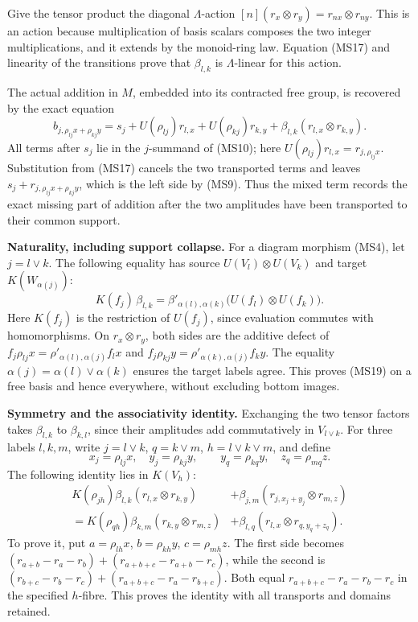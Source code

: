 \documentclass[
]{article}
\begin{document}
Give the tensor product the diagonal \(\Lambda\)-action
\([n](r_x\otimes r_y)=r_{nx}\otimes r_{ny}\). This is an action because
multiplication of basis scalars composes the two integer
multiplications, and it extends by the monoid-ring law. Equation (MS17)
and linearity of the transitions prove that \(\beta_{l,k}\) is
\(\Lambda\)-linear for this action.

The actual addition in \(M\), embedded into its contracted free group,
is recovered by the exact equation \[
b_{j,\rho_{lj}x+\rho_{kj}y}
=s_j+U(\rho_{lj})r_{l,x}+U(\rho_{kj})r_{k,y}
+\beta_{l,k}(r_{l,x}\otimes r_{k,y}).
\tag{MS18}
\] All terms after \(s_j\) lie in the \(j\)-summand of (MS10); here
\(U(\rho_{lj})r_{l,x}=r_{j,\rho_{lj}x}\). Substitution from (MS17)
cancels the two transported terms and leaves
\(s_j+r_{j,\rho_{lj}x+\rho_{kj}y}\), which is the left side by (MS9).
Thus the mixed term records the exact missing part of addition after the
two amplitudes have been transported to their common support.

\textbf{Naturality, including support collapse.} For a diagram morphism
(MS4), let \(j=l\vee k\). The following equality has source
\(U(V_l)\otimes U(V_k)\) and target \(K(W_{\alpha(j)})\): \[
K(f_j)\,\beta_{l,k}
=\beta'_{\alpha(l),\alpha(k)}
\bigl(U(f_l)\otimes U(f_k)\bigr).
\tag{MS19}
\] Here \(K(f_j)\) is the restriction of \(U(f_j)\), since evaluation
commutes with homomorphisms. On \(r_x\otimes r_y\), both sides are the
additive defect of \(f_j\rho_{lj}x=\rho'_{\alpha(l),\alpha(j)}f_lx\) and
\(f_j\rho_{kj}y=\rho'_{\alpha(k),\alpha(j)}f_ky\). The equality
\(\alpha(j)=\alpha(l)\vee\alpha(k)\) ensures the target labels agree.
This proves (MS19) on a free basis and hence everywhere, without
excluding bottom images.

\textbf{Symmetry and the associativity identity.} Exchanging the two
tensor factors takes \(\beta_{l,k}\) to \(\beta_{k,l}\), since their
amplitudes add commutatively in \(V_{l\vee k}\). For three labels
\(l,k,m\), write \(j=l\vee k\), \(q=k\vee m\), \(h=l\vee k\vee m\), and
define \[
x_j=\rho_{lj}x,\quad y_j=\rho_{kj}y,\qquad
y_q=\rho_{kq}y,\quad z_q=\rho_{mq}z.
\] The following identity lies in \(K(V_h)\): \[
\begin{split}
K(\rho_{jh})\beta_{l,k}(r_{l,x}\otimes r_{k,y})
&+\beta_{j,m}(r_{j,x_j+y_j}\otimes r_{m,z})\\
=K(\rho_{qh})\beta_{k,m}(r_{k,y}\otimes r_{m,z})
&+\beta_{l,q}(r_{l,x}\otimes r_{q,y_q+z_q}).
\end{split}
\tag{MS20}
\] To prove it, put \(a=\rho_{lh}x\), \(b=\rho_{kh}y\),
\(c=\rho_{mh}z\). The first side becomes
\((r_{a+b}-r_a-r_b)+(r_{a+b+c}-r_{a+b}-r_c)\), while the second is
\((r_{b+c}-r_b-r_c)+(r_{a+b+c}-r_a-r_{b+c})\). Both equal
\(r_{a+b+c}-r_a-r_b-r_c\) in the specified \(h\)-fibre. This proves the
identity with all transports and domains retained.
\end{document}
